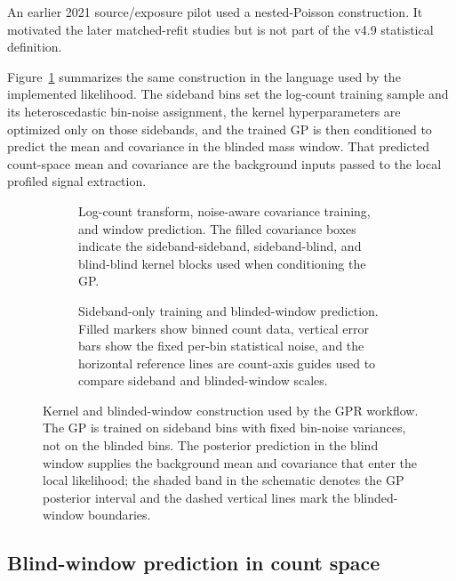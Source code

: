 An earlier 2021 source/exposure pilot used a nested-Poisson construction. It motivated
the later matched-refit studies but is not part of the v4.9 statistical definition.

Figure~\ref{fig:gpr-window-construction} summarizes the same construction in the
language used by the implemented likelihood. The sideband bins set the log-count
training sample and its heteroscedastic bin-noise assignment, the kernel hyperparameters
are optimized only on those sidebands, and the trained GP is then conditioned to predict
the mean and covariance in the blinded mass window. That predicted count-space mean and
covariance are the background inputs passed to the local profiled signal extraction.

\begin{figure}[H]
\centering
\begin{subfigure}[t]{0.52\linewidth}
  \centering
  \caption{Log-count transform, noise-aware covariance training, and window prediction.
  The filled covariance boxes indicate the sideband-sideband, sideband-blind, and
  blind-blind kernel blocks used when conditioning the GP.}
\end{subfigure}
\hfill
\begin{subfigure}[t]{0.45\linewidth}
  \centering
  \caption{Sideband-only training and blinded-window prediction. Filled markers show
  binned count data, vertical error bars show the fixed per-bin statistical noise, and
  the horizontal reference lines are count-axis guides used to compare sideband and
  blinded-window scales.}
\end{subfigure}
\caption{Kernel and blinded-window construction used by the GPR workflow. The GP is
trained on sideband bins with fixed bin-noise variances, not on the blinded bins. The
posterior prediction in the blind window supplies the background mean and covariance
that enter the local likelihood; the shaded band in the schematic denotes the GP
posterior interval and the dashed vertical lines mark the blinded-window boundaries.}
\label{fig:gpr-window-construction}
\end{figure}

\subsection{Blind-window prediction in count space}
\label{sec:blind-window-prediction}

